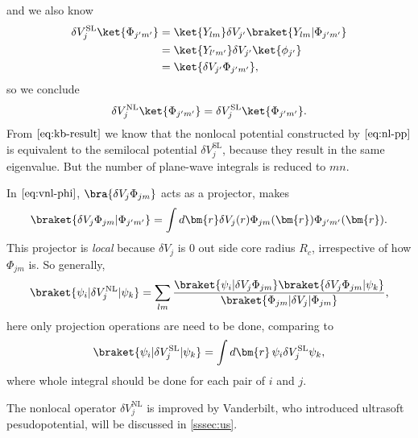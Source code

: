 and we also know
\begin{equation}
	\begin{split}
		\delta V_{j}^\text{SL} \ket{ \Phi_{j'm'} }
		 & = \ket{Y_{lm}} \delta V_{j'} \braket{Y_{lm} | \Phi_{j'm'} } \\
		 & = \ket{Y_{l'm'}} \delta V_{j'} \ket{\phi_{j'}}              \\
		 & = \ket{ \delta V_{j'} \Phi_{j'm'} },
	\end{split}
\end{equation}
so we conclude
\begin{equation}\label{eq:kb-result}
	\delta V_j^\text{NL} \ket{\Phi_{j'm'}} = \delta V_{j}^\text{SL} \ket{ \Phi_{j'm'} }.
\end{equation}
From $\eqref{eq:kb-result}$ we know that the nonlocal potential constructed by
$\eqref{eq:nl-pp}$ is equivalent to the semilocal potential $\delta V_{j}^\text{SL}$,
because they result in the same eigenvalue. But the number of
plane-wave integrals is reduced to $mn$.

In $\eqref{eq:vnl-phi}$, $\bra{\delta V_j \Phi_{jm}}$ acts as a projector,\cite{martin2004electronic} makes
\begin{equation}
	\braket{\delta V_j \Phi_{jm} | \Phi_{j'm'} } = \int d\bm{r} \delta V_j (r)
	\Phi_{jm} (\bm{r}) \Phi_{j'm'} (\bm{r}).
\end{equation}
This projector
is \emph{local} because $\delta V_j$ is $0$ out side core radius $R_c$,
irrespective of how $\Phi_{jm}$ is.
So generally,\cite{martin2004electronic}
\begin{equation}
	\braket{ \psi_i | \delta V_j^\text{NL} | \psi_k }
	= \sum_{lm}
	\frac{ \braket{\psi_i | \delta V_j \Phi_{jm}}
		\braket{\delta V_j \Phi_{jm}  | \psi_k } }{
		\braket{ \Phi_{jm} | \delta V_j | \Phi_{jm} } },
\end{equation}
here only projection operations are need to be done,
comparing to
\begin{equation}
	\braket{ \psi_i | \delta V_j^\text{SL} | \psi_k }
	= \int d\bm{r} \, \psi_i \delta V_j^\text{SL} \psi_k,
\end{equation}
where whole integral should be done for each pair of $i$ and $j$.

The nonlocal operator $\delta V_j^\text{NL}$ is improved
by Vanderbilt\cite{Vanderbilt:1990is}, who introduced ultrasoft pesudopotential, will be discussed in \ref{sssec:us}.